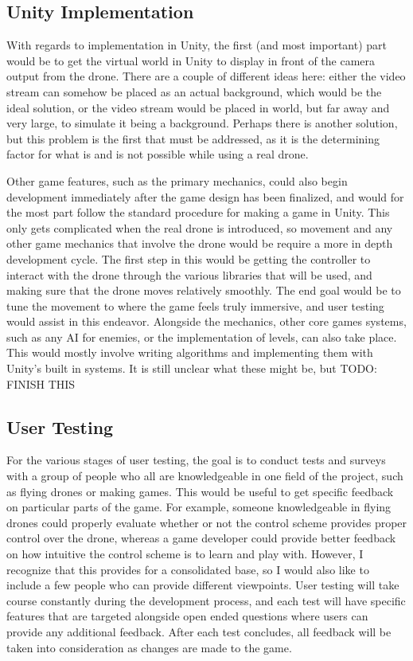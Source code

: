 \documentclass[10pt,twocolumn]{article}
\begin{document}
\subsection{Unity Implementation}
With regards to implementation in Unity, the first (and most important) part would be to get the virtual world in Unity to display in front of the camera output from the drone. There are a couple of different ideas here: either the video stream can somehow be placed as an actual background, which would be the ideal solution, or the video stream would be placed in world, but far away and very large, to simulate it being a background. Perhaps there is another solution, but this problem is the first that must be addressed, as it is the determining factor for what is and is not possible while using a real drone. 

Other game features, such as the primary mechanics, could also begin development immediately after the game design has been finalized, and would for the most part follow the standard procedure for making a game in Unity. This only gets complicated when the real drone is introduced, so movement and any other game mechanics that involve the drone would be require a more in depth development cycle. The first step in this would be getting the controller to interact with the drone through the various libraries that will be used, and making sure that the drone moves relatively smoothly. The end goal would be to tune the movement to where the game feels truly immersive, and user testing would assist in this endeavor. Alongside the mechanics, other core games systems, such as any AI for enemies, or the implementation of levels, can also take place. This would mostly involve writing algorithms and implementing them with Unity's built in systems. It is still unclear what these might be, but TODO: FINISH THIS




\subsection{User Testing}
For the various stages of user testing, the goal is to conduct tests and surveys with a group of people who all are knowledgeable in one field of the project, such as flying drones or making games. This would be useful to get specific feedback on particular parts of the game. For example, someone knowledgeable in flying drones could properly evaluate whether or not the control scheme provides proper control over the drone, whereas a game developer could provide better feedback on how intuitive the control scheme is to learn and play with. However, I recognize that this provides for a consolidated base, so I would also like to include a few people who can provide different viewpoints. User testing will take course constantly during the development process, and each test will have specific features that are targeted alongside open ended questions where users can provide any additional feedback. After each test concludes, all feedback will be taken into consideration as changes are made to the game.
\end{document}
